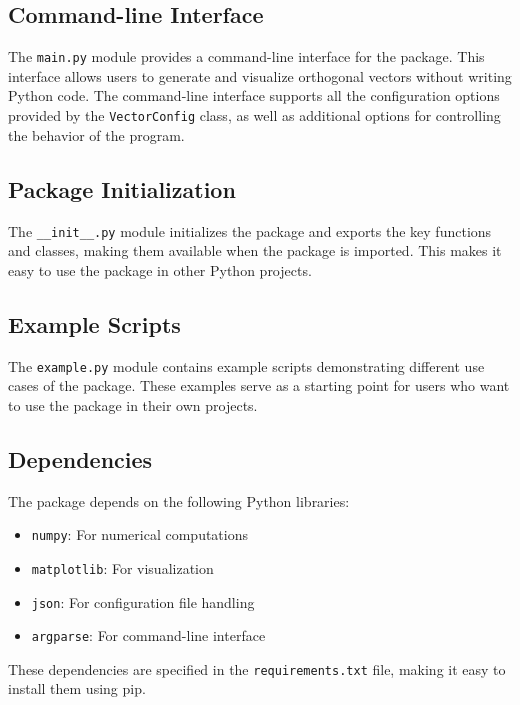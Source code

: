 \subsection{Command-line Interface}

The \texttt{main.py} module provides a command-line interface for the package. This interface allows users to generate and visualize orthogonal vectors without writing Python code. The command-line interface supports all the configuration options provided by the \texttt{VectorConfig} class, as well as additional options for controlling the behavior of the program.

\subsection{Package Initialization}

The \texttt{\_\_init\_\_.py} module initializes the package and exports the key functions and classes, making them available when the package is imported. This makes it easy to use the package in other Python projects.

\subsection{Example Scripts}

The \texttt{example.py} module contains example scripts demonstrating different use cases of the package. These examples serve as a starting point for users who want to use the package in their own projects.

\subsection{Dependencies}

The package depends on the following Python libraries:

\begin{itemize}
    \item \texttt{numpy}: For numerical computations
    \item \texttt{matplotlib}: For visualization
    \item \texttt{json}: For configuration file handling
    \item \texttt{argparse}: For command-line interface
\end{itemize}

These dependencies are specified in the \texttt{requirements.txt} file, making it easy to install them using pip.
